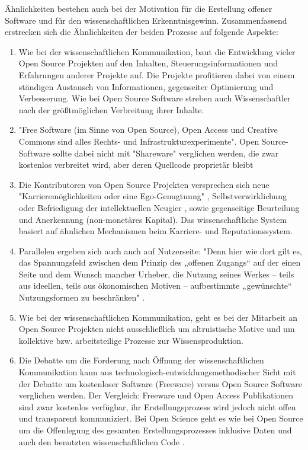 Ähnlichkeiten bestehen auch bei der Motivation für die Erstellung offener Software und für den wissenschaftlichen Erkenntnisgewinn. Zusammenfassend erstrecken sich die Ähnlichkeiten der beiden Prozesse auf folgende Aspekte:
\begin{enumerate}
\item Wie bei der wissenschaftlichen Kommunikation, baut die Entwicklung vieler Open Source Projekten auf den Inhalten, Steuerungsinformationen und Erfahrungen anderer Projekte auf. Die Projekte profitieren dabei von einem ständigen Austausch von Informationen, gegenseiter Optimierung und Verbesserung. Wie bei Open Source Software streben auch Wissenschaftler nach der größtmöglichen Verbreitung ihrer Inhalte.
\item "Free Software (im Sinne von Open Source), Open Access und Creative Commons sind alles Rechts- und Infrastrukturexperimente"\cite{kelty_2004}. Open Source-Software sollte dabei nicht mit "Shareware" verglichen werden, die zwar kostenlos verbreitet wird, aber deren Quellcode proprietär bleibt \cite{Lerner_2001}
\item Die Kontributoren von Open Source Projekten versprechen sich neue "Karrieremöglichkeiten oder eine Ego-Genugtuung" \cite{Lerner_2001}, Selbstverwirklichung oder Befriedigung der intellektuellen Neugier \cite{Willinsky_2005}, sowie gegenseitige Beurteilung und Anerkennung (non-monetäres Kapital). Das wissenschaftliche System basiert auf ähnlichen Mechanismen beim Karriere- und Reputationssystem.
\item Parallelen ergeben sich auch auch auf Nutzerseite: "Denn hier wie dort gilt es, das Spannungsfeld zwischen dem Prinzip des „offenen Zugangs“ auf der einen Seite und dem Wunsch mancher Urheber, die Nutzung seines Werkes – teils aus ideellen, teils aus ökonomischen Motiven – aufbestimmte „gewünschte“ Nutzungsformen zu beschränken" \cite{dorschel_2006_open}.
\item Wie bei der wissenschaftlichen Kommunikation, geht es bei der Mitarbeit an Open Source Projekten nicht ausschließlich um altruistische Motive \cite{Lerner_2001} und um kollektive bzw. arbeitsteilige Prozesse zur Wissensproduktion.
\item Die Debatte um die Forderung nach Öffnung der wissenschaftlichen Kommunikation kann aus technologisch-entwicklungsmethodischer Sicht mit der Debatte um kostenloser Software (Freeware) versus Open Source Software verglichen werden. Der Vergleich: Freeware und Open Access Publikationen sind zwar kostenlos verfügbar, ihr Erstellungsprozess wird jedoch nicht offen und transparent kommuniziert. Bei Open Science geht es wie bei Open Source um die Offenlegung des gesamten Erstellungsprozesses inklusive Daten \cite{grand_2012_open} und auch den benutzten wissenschaftlichen Code \cite{hey_2015_open}.
\end{enumerate}

